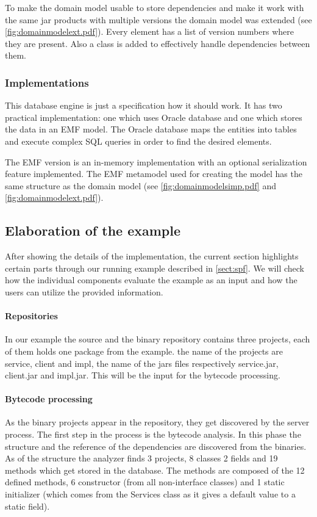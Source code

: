 To make the domain model usable to store dependencies and make it work with the
same jar products with multiple versions the domain model was extended (see
\autoref{fig:domainmodelext.pdf}).  Every element has a list of version numbers where they are
present. Also a  class is added to effectively handle
dependencies between them.

\subsubsection{Implementations}
This database engine is just a specification how it should work. It has two
practical implementation: one which uses Oracle database and one which stores
the data in an EMF model. The Oracle database maps the entities into tables and
execute complex SQL queries in order to find the desired elements.

The EMF version is an in-memory implementation with an optional serialization
feature implemented. The EMF metamodel used for creating the model has the same
structure as the domain model (see \autoref{fig:domainmodelsimp.pdf} and
\autoref{fig:domainmodelext.pdf}).



\subsection{Elaboration of the example}\label{sect:elabex1}
After showing the details of the implementation, the current section highlights
certain parts through our running example described in \autoref{sect:spf}.
We will check how the individual components evaluate the example as an input and
how the users can utilize the provided information.

\paragraph{Repositories}
In our example the source and the binary
repository contains three pro\-jects, each of them holds one package from the
example. the name of the projects are service, client and impl, the name of 
the jars files respectively service.jar, client.jar and impl.jar. 
This will be the input for the bytecode processing.

\paragraph{Bytecode processing}
As 
the binary projects appear in the repository, they get discovered by the 
server process. 
The first step in the process is the bytecode analysis. In this phase the
structure and the reference of the dependencies are discovered from the
binaries. As of the structure the analyzer finds 3 projects, 8 classes 2 fields
and 19 methods which get stored in the database.
The methods are composed of the 12 defined methods, 6 constructor (from all
non-interface classes) and 1 static initializer (which comes from the Services
class as it gives a default value to a static field).

